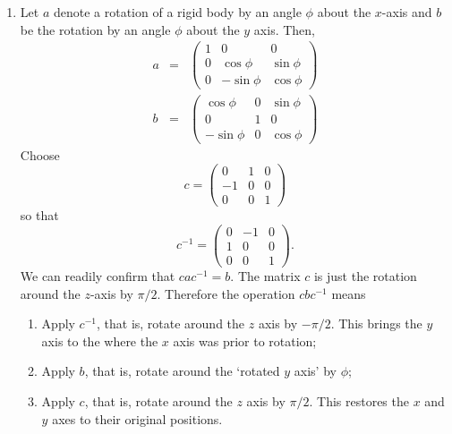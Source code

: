 \documentclass{article}
\theoremstyle{plain}
\numberwithin{thm}{section}
\theoremstyle{plain}
\numberwithin{prop}{section}
\theoremstyle{definition}
\numberwithin{defn}{section}
\theoremstyle{remark}
\numberwithin{equation}{section}
\begin{document}
\begin{enumerate}
\item
Let $a$ denote a rotation of a rigid body by an angle $\phi$ about the $x$-axis
and $b$ be the rotation by an angle $\phi$ about the $y$ axis. Then,
\begin{eqnarray}
a &=& \begin{pmatrix}1 & 0 & 0 \\ 0 & \cos\phi & \sin\phi \\
0 & -\sin\phi & \cos\phi\end{pmatrix} \label{s2e1} \\
b &=& \begin{pmatrix} \cos\phi & 0 & \sin\phi \\ 0 & 1 & 0 \\
-\sin\phi  & 0 & \cos\phi\end{pmatrix} \label{s2e2} 
\end{eqnarray}
Choose
\begin{equation}\label{s2e3}
c = \begin{pmatrix}0 & 1 & 0 \\ -1 & 0 & 0 \\ 0 & 0 & 1\end{pmatrix}
\end{equation}
so that
\begin{equation}\label{s2e4}
c^{-1} = \begin{pmatrix}0 & -1 & 0 \\ 1 & 0 & 0 \\ 0 & 0 & 1\end{pmatrix}.
\end{equation}
We can readily confirm that $cac^{-1} = b$. The matrix $c$ is just the
rotation around the $z$-axis by $\pi/2$. Therefore the operation $cbc^{-1}$ 
means
\begin{enumerate}
\item Apply $c^{-1}$, that is, rotate around the $z$ axis by $-\pi/2$. This
brings the $y$ axis to the where the $x$ axis was prior to rotation;
\item Apply $b$, that is, rotate around the `rotated $y$ axis' by $\phi$;
\item Apply $c$, that is, rotate around the $z$ axis by $\pi/2$. This restores
the $x$ and $y$ axes to their original positions.
\end{enumerate}


\end{enumerate}
\end{document}
